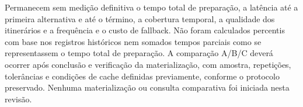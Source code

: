 Permanecem sem medição definitiva o tempo total de preparação, a latência até a primeira alternativa e até o término, a cobertura temporal, a qualidade dos itinerários e a frequência e o custo de fallback. Não foram calculados percentis com base nos registros históricos nem somados tempos parciais como se representassem o tempo total de preparação. A comparação A/B/C deverá ocorrer após conclusão e verificação da materialização, com amostra, repetições, tolerâncias e condições de cache definidas previamente, conforme o protocolo preservado. Nenhuma materialização ou consulta comparativa foi iniciada nesta revisão.

